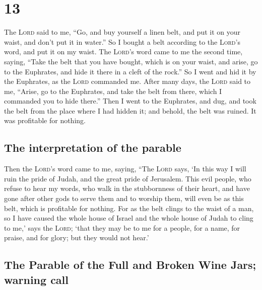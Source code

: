 \hypertarget{section-12}{%
\section{13}\label{section-12}}

 The \textsc{Lord} said to me, ``Go, and buy yourself a
linen belt, and put it on your waist, and don't put it in water.''
 So I bought a belt according to the \textsc{Lord}'s word,
and put it on my waist.  The \textsc{Lord}'s word came to
me the second time, saying,  ``Take the belt that you have
bought, which is on your waist, and arise, go to the Euphrates, and hide
it there in a cleft of the rock.''  So I went and hid it
by the Euphrates, as the \textsc{Lord} commanded me. 
After many days, the \textsc{Lord} said to me, ``Arise, go to the
Euphrates, and take the belt from there, which I commanded you to hide
there.''  Then I went to the Euphrates, and dug, and took
the belt from the place where I had hidden it; and behold, the belt was
ruined. It was profitable for nothing.

\hypertarget{the-interpretation-of-the-parable}{%
\subsection{The interpretation of the
parable}\label{the-interpretation-of-the-parable}}

 Then the \textsc{Lord}'s word came to me, saying,
 ``The \textsc{Lord} says, `In this way I will ruin the
pride of Judah, and the great pride of Jerusalem.  This
evil people, who refuse to hear my words, who walk in the stubbornness
of their heart, and have gone after other gods to serve them and to
worship them, will even be as this belt, which is profitable for
nothing.  For as the belt clings to the waist of a man,
so I have caused the whole house of Israel and the whole house of Judah
to cling to me,' says the \textsc{Lord}; `that they may be to me for a
people, for a name, for praise, and for glory; but they would not hear.'

\hypertarget{the-parable-of-the-full-and-broken-wine-jars-warning-call}{%
\subsection{The Parable of the Full and Broken Wine Jars; warning
call}\label{the-parable-of-the-full-and-broken-wine-jars-warning-call}}

